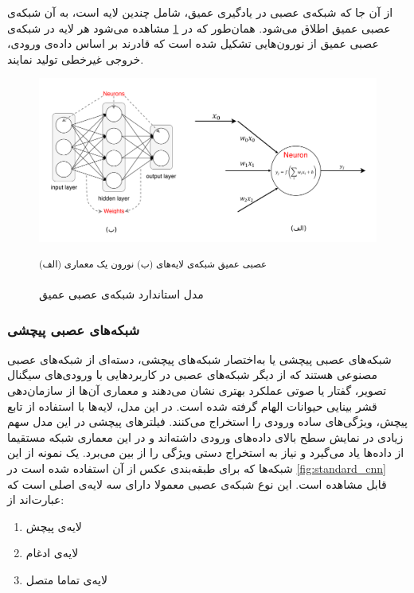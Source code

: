 از آن جا که شبکه‌ی عصبی در یادگیری عمیق، شامل چندین لایه است، به آن شبکه‌ی عصبی عمیق اطلاق می‌شود. همان‌طور که در \cref{fig:standard_nn} مشاهده می‌شود هر لایه در شبکه‌ی عصبی عمیق از نورون‌هایی تشکیل شده است که قادرند بر اساس داده‌ی ورودی، خروجی غیرخطی تولید نمایند.

\begin{figure}[h]
    \centering
	\includegraphics[width=1\linewidth]{figures/standard_nn.png}
	\caption{مدل استاندارد شبکه‌ی عصبی عمیق \cite{zhou2019edge}}
	\small\textsuperscript{عصبی عمیق شبکه‌ی لایه‌های (ب) نورون یک معماری (الف)}
	\label{fig:standard_nn}
\end{figure}

\subsubsection{شبکه‌های عصبی پیچشی}

شبکه‌های عصبی پیچشی یا به‌اختصار شبکه‌های پیچشی، دسته‌ای از شبکه‌های عصبی مصنوعی هستند که از دیگر شبکه‌های عصبی در کاربردهایی با ورودی‌های سیگنال تصویر، گفتار یا صوتی عملکرد بهتری نشان می‌دهند و معماری آن‌ها از سازمان‌دهی قشر بینایی حیوانات الهام گرفته شده است.  در این مدل، لایه‌ها با استفاده از تابع پیچش، ویژگی‌های ساده ورودی را استخراج می‌کنند. فیلترهای پیچشی در این مدل سهم زیادی در نمایش سطح بالای داده‌های ورودی داشته‌اند و در این معماری شبکه مستقیما از داده‌ها یاد می‌گیرد و نیاز به استخراج دستی ویژگی را از بین می‌برد. یک نمونه از این شبکه‌ها که برای طبقه‌بندی عکس از آن استفاده شده است در \cref{fig:standard_cnn} قابل ‌مشاهده است. این نوع شبکه‌ی عصبی معمولا دارای سه ‌لایه‌ی اصلی است که عبارت‌اند از: 

\begin{enumerate}
	\item لایه‌ی پیچش
	
	\item لایه‌ی ادغام
	
	\item لایه‌ی تماما متصل
\end{enumerate}

